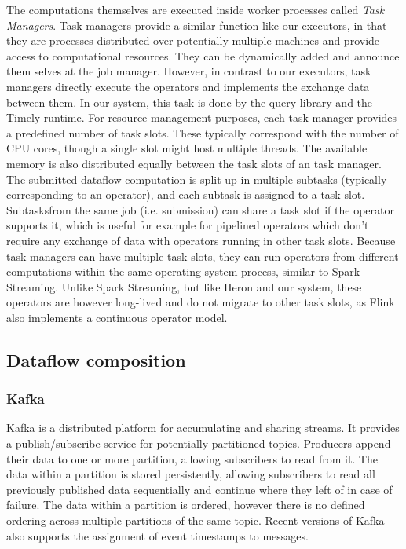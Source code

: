 The computations themselves are executed inside worker processes called
\emph{Task Managers}. Task managers provide a similar function like our executors, in that
they are processes distributed over potentially multiple machines and provide access to
computational resources. They can be dynamically added and announce them selves at the
job manager. However, in contrast to our executors, task managers directly execute the
operators and implements the exchange data between them. In our system, this task is done by the
query library and the Timely runtime. For resource management purposes, each task manager provides
a predefined number of task slots. These typically correspond with the number of CPU cores,
though a single slot might host multiple threads. The available memory is also distributed
equally between the task slots of an task manager. The submitted dataflow computation is split up
in multiple subtasks (typically corresponding to an operator), and each subtask is assigned
to a task slot. Subtasksfrom the same job (i.e. submission) can share a task slot
if the operator supports it, which is useful for example for pipelined operators which don't
require any exchange of data with operators running in other task slots.
Because task managers can have multiple task slots, they can run operators from different
computations within the same operating system process, similar to Spark Streaming. Unlike
Spark Streaming, but like Heron and our system, these operators are however long-lived
and do not migrate to other task slots, as Flink also implements a continuous operator model.

\subsection{Dataflow composition}

\subsubsection{Kafka}

Kafka \cite{kafka} is a distributed platform for accumulating and sharing streams. It provides
a publish/subscribe service for potentially partitioned topics. Producers append
their data to one or more partition, allowing subscribers to read from it.
The data within a partition is stored persistently, allowing subscribers to
read all previously published data sequentially and continue where they left
of in case of failure. The data within a partition is ordered, however there
is no defined ordering across multiple partitions of the same topic. Recent
versions of Kafka also supports the assignment of event timestamps to messages.

